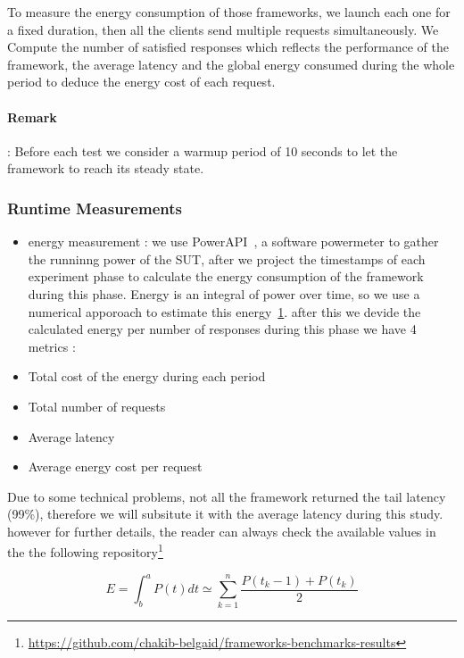 To measure the energy consumption of those frameworks, we launch each one for a fixed duration, then all the clients send multiple requests simultaneously.
We Compute the number of satisfied responses which reflects the performance of the framework, the average latency and the global energy consumed during the whole period to deduce the energy cost of each request.

\paragraph{Remark}:
Before each test we consider a warmup period of 10 seconds to let the framework to reach its steady state.

\subsubsection{Runtime Measurements}
\begin{itemize}
    \item energy measurement :
          we use PowerAPI~\cite{bourdon:hal-00772454}, a software powermeter  to gather the runninng power of the SUT, after we project the timestamps of each experiment phase to calculate the energy consumption of the framework during this phase.
          Energy is an integral of power over time, so we use a numerical apporoach to estimate this energy~\ref{fig:trapezrule}.
          after this we devide the calculated energy per number of responses
          during this phase
          we have 4 metrics :

    \item Total cost of the energy during each period
    \item Total number of requests
    \item Average latency
    \item Average energy cost per request
\end{itemize}

Due to some technical problems, not all the framework returned the tail latency (99\%), therefore we will subsitute it with the average latency during this study. however for further details, the reader can always check the available values in the the following repository\footnote{\url{https://github.com/chakib-belgaid/frameworks-benchmarks-results}}
\begin{figure}[hbt]
    \centering
    \begin{equation}
        E = \int^a_b P(t)dt \simeq \sum^n_{k=1} \frac{P(t_k-1)+P(t_k)}{2}
    \end{equation}
    \caption{}
    \label{fig:trapezrule}
\end{figure}

